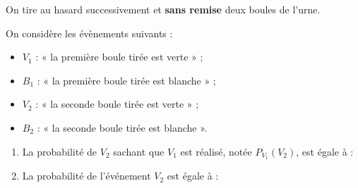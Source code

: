 On tire au hasard successivement et \textbf{sans remise} deux boules de l’urne.

On considère les évènements suivants :

\begin{itemize}
	\item $V_1$ : « la première boule tirée est verte » ; 
	\item $B_1$ : « la première boule tirée est blanche » ;
	\item $V_2$ : « la seconde boule tirée est verte » ; 
	\item $B_2$ : « la seconde boule tirée est blanche ».
\end{itemize}

\begin{enumerate}[resume]
	\item La probabilité de $V_2$ sachant que $V_1$ est réalisé, notée $P_{V_1} (V_2)$, est égale à :
	
	\item La probabilité de l’événement $V_2$ est égale à :
	
\end{enumerate}

